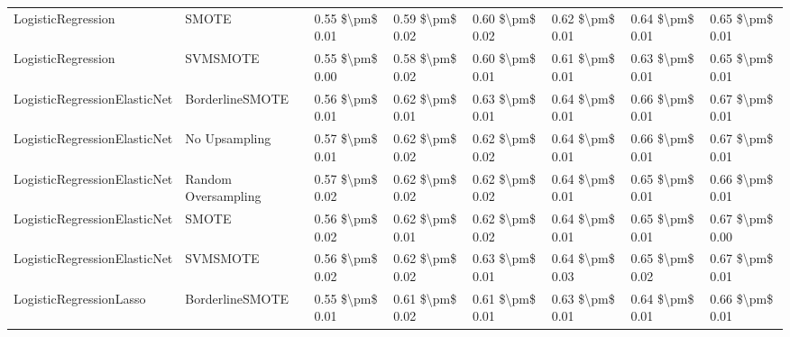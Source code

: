 \begin{tabular}{llllllll}
             LogisticRegression &                         SMOTE & 0.55 \$\textbackslash pm\$ 0.01 &           0.59 \$\textbackslash pm\$ 0.02 &       0.60 \$\textbackslash pm\$ 0.02 &        0.62 \$\textbackslash pm\$ 0.01 &                         0.64 \$\textbackslash pm\$ 0.01 &     0.65 \$\textbackslash pm\$ 0.01 \\
             LogisticRegression &                      SVMSMOTE & 0.55 \$\textbackslash pm\$ 0.00 &           0.58 \$\textbackslash pm\$ 0.02 &       0.60 \$\textbackslash pm\$ 0.01 &        0.61 \$\textbackslash pm\$ 0.01 &                         0.63 \$\textbackslash pm\$ 0.01 &     0.65 \$\textbackslash pm\$ 0.01 \\
   LogisticRegressionElasticNet &               BorderlineSMOTE & 0.56 \$\textbackslash pm\$ 0.01 &           0.62 \$\textbackslash pm\$ 0.01 &       0.63 \$\textbackslash pm\$ 0.01 &        0.64 \$\textbackslash pm\$ 0.01 &                         0.66 \$\textbackslash pm\$ 0.01 &     0.67 \$\textbackslash pm\$ 0.01 \\
   LogisticRegressionElasticNet &                 No Upsampling & 0.57 \$\textbackslash pm\$ 0.01 &           0.62 \$\textbackslash pm\$ 0.02 &       0.62 \$\textbackslash pm\$ 0.02 &        0.64 \$\textbackslash pm\$ 0.01 &                         0.66 \$\textbackslash pm\$ 0.01 &     0.67 \$\textbackslash pm\$ 0.01 \\
   LogisticRegressionElasticNet &           Random Oversampling & 0.57 \$\textbackslash pm\$ 0.02 &           0.62 \$\textbackslash pm\$ 0.02 &       0.62 \$\textbackslash pm\$ 0.02 &        0.64 \$\textbackslash pm\$ 0.01 &                         0.65 \$\textbackslash pm\$ 0.01 &     0.66 \$\textbackslash pm\$ 0.01 \\
   LogisticRegressionElasticNet &                         SMOTE & 0.56 \$\textbackslash pm\$ 0.02 &           0.62 \$\textbackslash pm\$ 0.01 &       0.62 \$\textbackslash pm\$ 0.02 &        0.64 \$\textbackslash pm\$ 0.01 &                         0.65 \$\textbackslash pm\$ 0.01 &     0.67 \$\textbackslash pm\$ 0.00 \\
   LogisticRegressionElasticNet &                      SVMSMOTE & 0.56 \$\textbackslash pm\$ 0.02 &           0.62 \$\textbackslash pm\$ 0.02 &       0.63 \$\textbackslash pm\$ 0.01 &        0.64 \$\textbackslash pm\$ 0.03 &                         0.65 \$\textbackslash pm\$ 0.02 &     0.67 \$\textbackslash pm\$ 0.01 \\
        LogisticRegressionLasso &               BorderlineSMOTE & 0.55 \$\textbackslash pm\$ 0.01 &           0.61 \$\textbackslash pm\$ 0.02 &       0.61 \$\textbackslash pm\$ 0.01 &        0.63 \$\textbackslash pm\$ 0.01 &                         0.64 \$\textbackslash pm\$ 0.01 &     0.66 \$\textbackslash pm\$ 0.01 \\

\end{tabular}
